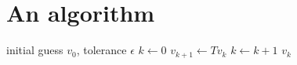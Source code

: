 \section{An algorithm}

\begin{algorithm}
\caption{Value iteration}
\label{algo:vi}
\begin{algorithmic}
\REQUIRE initial guess $v_0$, tolerance $\epsilon$
\STATE $k \gets 0$
    \STATE $v_{k+1} \gets T v_k$
    \STATE $k \gets k + 1$
\ENDWHILE
\RETURN $v_k$
\end{algorithmic}
\end{algorithm}
